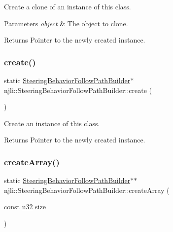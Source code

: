 Create a clone of an instance of this class.


\begin{DoxyParams}{Parameters}
{\em object} & The object to clone.\\
\hline
\end{DoxyParams}
\begin{DoxyReturn}{Returns}
Pointer to the newly created instance. 
\end{DoxyReturn}
\mbox{\label{classnjli_1_1_steering_behavior_follow_path_builder_a8f31ab518628db64017311fcabcefc5e}} 
\subsubsection{\texorpdfstring{create()}{create()}}
{\footnotesize\ttfamily static \mbox{\hyperlink{classnjli_1_1_steering_behavior_follow_path_builder}{Steering\+Behavior\+Follow\+Path\+Builder}}$\ast$ njli\+::\+Steering\+Behavior\+Follow\+Path\+Builder\+::create (\begin{DoxyParamCaption}{ }\end{DoxyParamCaption})\hspace{0.3cm}{\ttfamily [static]}}

Create an instance of this class.

\begin{DoxyReturn}{Returns}
Pointer to the newly created instance. 
\end{DoxyReturn}
\mbox{\label{classnjli_1_1_steering_behavior_follow_path_builder_a05cc13a4fe768aafab949ad750992d46}} 
\subsubsection{\texorpdfstring{create\+Array()}{createArray()}}
{\footnotesize\ttfamily static \mbox{\hyperlink{classnjli_1_1_steering_behavior_follow_path_builder}{Steering\+Behavior\+Follow\+Path\+Builder}}$\ast$$\ast$ njli\+::\+Steering\+Behavior\+Follow\+Path\+Builder\+::create\+Array (\begin{DoxyParamCaption}\item[{const \mbox{\hyperlink{_util_8h_a10e94b422ef0c20dcdec20d31a1f5049}{u32}}}]{size }\end{DoxyParamCaption})\hspace{0.3cm}{\ttfamily [static]}}

